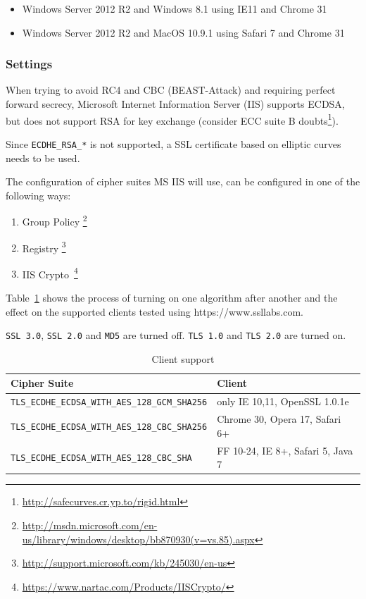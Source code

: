 \begin{itemize}
\item Windows Server 2012 R2 and Windows 8.1 using IE11 and Chrome 31
\item Windows Server 2012 R2 and MacOS 10.9.1 using Safari 7 and Chrome 31
\end{itemize}

\subsubsection{Settings}


When trying to avoid RC4 and CBC (BEAST-Attack) and requiring perfect
forward secrecy, Microsoft Internet Information Server (IIS) supports
ECDSA, but does not support RSA for key exchange (consider ECC suite
B doubts\footnote{\url{http://safecurves.cr.yp.to/rigid.html}}).

Since \verb|ECDHE_RSA_*| is not supported, a SSL certificate based on
elliptic curves needs to be used.

The configuration of cipher suites MS IIS will use, can be configured in one
of the following ways:
\begin{enumerate}
\item Group Policy \footnote{\url{http://msdn.microsoft.com/en-us/library/windows/desktop/bb870930(v=vs.85).aspx}}
\item Registry \footnote{\url{http://support.microsoft.com/kb/245030/en-us}}
\item IIS Crypto~\footnote{\url{https://www.nartac.com/Products/IISCrypto/}}
\end{enumerate}


Table~\ref{tab:MS_IIS_Client_Support} shows the process of turning on
one algorithm after another and the effect on the supported clients
tested using https://www.ssllabs.com.

\verb|SSL 3.0|, \verb|SSL 2.0| and \verb|MD5| are turned off.
\verb|TLS 1.0| and \verb|TLS 2.0| are turned on.

\begin{table}[h]
  \centering
  \small
  \begin{tabular}{ll}
    \toprule
    Cipher Suite & Client \\
    \midrule
    \verb|TLS_ECDHE_ECDSA_WITH_AES_128_GCM_SHA256| & only IE 10,11, OpenSSL 1.0.1e \\
    \verb|TLS_ECDHE_ECDSA_WITH_AES_128_CBC_SHA256| & Chrome 30, Opera 17, Safari 6+ \\
    \verb|TLS_ECDHE_ECDSA_WITH_AES_128_CBC_SHA| & FF 10-24, IE 8+, Safari 5, Java 7\\
    \bottomrule 
 \end{tabular}
  \caption{Client support}
  \label{tab:MS_IIS_Client_Support}
\end{table}

